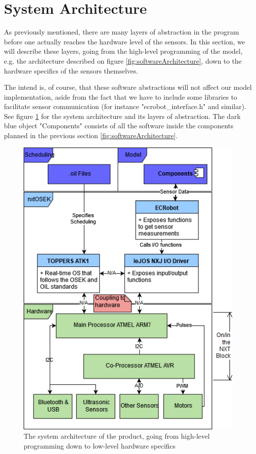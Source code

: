 \section{System Architecture}
As previously mentioned, there are many layers of abstraction in the program before one actually reaches the hardware level of the sensors. In this section, we will describe these layers, going from the high-level programming of the model, e.g. the architecture described on figure \ref{fig:softwareArchitecture}, down to the hardware specifics of the sensors themselves. 

The intend is, of course, that these software abstractions will not affect our model implementation, aside from the fact that we have to include some libraries to facilitate sensor communication (for instance "ecrobot\_interface.h" and similar). See figure \ref{fig:abstractionLayers} for the system architecture and its layers of abstraction. The dark blue object "Components" consists of all the software inside the components planned in the previous section \ref{fig:softwareArchitecture}. 

\begin{figure}[H]
    \includegraphics[width=\textwidth]{Images/Design/abstractionLayerDiagram.png}
    \caption{The system architecture of the product, going from high-level programming down to low-level hardware specifics}
    \label{fig:abstractionLayers}
\end{figure}

